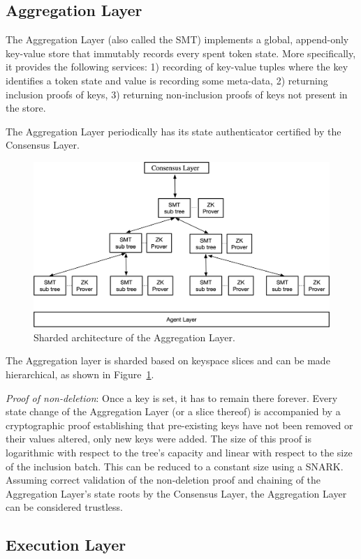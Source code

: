 \documentclass[twocolumn]{article}
\begin{document}
\subsection{Aggregation Layer}

The Aggregation Layer (also called the SMT) implements a global, append-only key-value store that immutably records every spent token state. More specifically, it provides the following services: 1) recording of key-value tuples where the key identifies a token state and value is recording some meta-data, 2) returning inclusion proofs of keys, 3) returning non-inclusion proofs of keys not present in the store.

The Aggregation Layer periodically has its state authenticator certified by the Consensus Layer.

\begin{figure}[!t]
    \centering
    \includegraphics[width=.7\textwidth]{pic/layers}
    \caption{Sharded architecture of the Aggregation Layer.}\label{fig:sharding}
\end{figure}

The Aggregation layer is sharded based on keyspace slices and can be made hierarchical, as shown in Figure~\ref{fig:sharding}.

\emph{Proof of non-deletion}: Once a key is set, it has to remain there forever. Every state change of the Aggregation Layer (or a slice thereof) is accompanied by a cryptographic proof establishing that pre-existing keys have not been removed or their values altered, only new keys were added. The size of this proof is logarithmic with respect to the tree's capacity and linear with respect to the size of the inclusion batch. This can be reduced to a constant size using a SNARK. Assuming correct validation of the non-deletion proof and chaining of the Aggregation Layer's state roots by the Consensus Layer, the Aggregation Layer can be considered trustless.


\subsection{Execution Layer}
\end{document}
